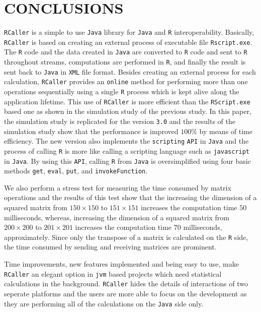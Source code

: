 \documentclass[10pt,a4paper, final, oneside]{article}
\begin{document}



\section{CONCLUSIONS}
\label{sec:conclusion}
\texttt{RCaller} is a simple to use \texttt{Java} library for \texttt{Java} and \texttt{R} interoperability.
Basically, \texttt{RCaller} is based on creating an external process of executable file \texttt{Rscript.exe}. The \texttt{R} code and the data created in \texttt{Java} are converted to \texttt{R} code and sent to \texttt{R} throughout streams, computations are performed in \texttt{R}, and finally the result is sent back to \texttt{Java} in \texttt{XML} file format. Besides creating an external process for each calculation, \texttt{RCaller} provides an \texttt{online} method for performing more than one operations sequentially using a single \texttt{R} process which is kept alive along the application lifetime. This use of \texttt{RCaller} is more efficient than the \texttt{RScript.exe} based one as shown in the simulation study of the previous study. In this paper, the simulation study is replicated for the version \texttt{3.0} and the results of the simulation study show that the performance is improved $100\%$ by means of time efficiency. The new version also implements the \texttt{scripting} \texttt{API} in \texttt{Java} and the process of calling \texttt{R} is more like calling a scripting language such as \texttt{javascript} in \texttt{Java}. By using this \texttt{API}, calling \texttt{R} from \texttt{Java} is oversimplified using four basic methods \texttt{get}, \texttt{eval}, \texttt{put}, and \texttt{invokeFunction}. 

We also perform a stress test for measuring the time consumed by matrix operations and the results of this test show that the increasing the dimension of a squared matrix from $150 \times 150$ to $151 \times 151$ increases the computation time $50$ milliseconds, whereas, increasing the dimension of a squared matrix from $200 \times 200$ to $201 \times 201$ increases the computation time $70$ milliseconds, approximately. Since only the transpose of a matrix is calculated on the \texttt{R} side, the time consumed by sending and receiving matrices are prominent. 

Time improvements, new features implemented and being easy to use, make \texttt{RCaller} an elegant option in \texttt{jvm} based projects which need statistical calculations in the background. \texttt{RCaller} hides the details of interactions of two seperate platforms and the users are more able to focus on the development as they are performing all of the calculations on the \texttt{Java} side only.
\end{document}
